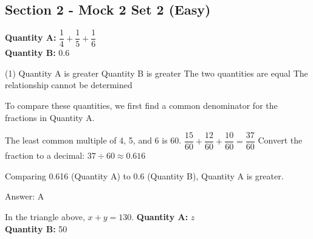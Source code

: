 \documentclass[11pt,paper=a4,answers]{exam}
\begin{document}
\begin{questions}
\pointsinrightmargin
\pointsdroppedatright
\marksnotpoints
{}
\pointformat{\boldmath\themarginpoints}
\bracketedpoints


\section*{Section 2 - Mock 2 Set 2 (Easy)}


\question
\textbf{Quantity A: } $\dfrac{1}{4} + \dfrac{1}{5} + \dfrac{1}{6}$ \\
\vspace{5pt}
\textbf{Quantity B: } 0.6

\begin{tasks}(1)
\task[A)] Quantity A is greater
\task[B)] Quantity B is greater
\task[C)] The two quantities are equal
\task[D)] The relationship cannot be determined
\end{tasks}

\begin{solution}
To compare these quantities, we first find a common denominator for the fractions in Quantity A.
\vspace{5pt}
\begin{center}
The least common multiple of 4, 5, and 6 is 60.
\vspace{5pt}
$\dfrac{15}{60} + \dfrac{12}{60} + \dfrac{10}{60} = \dfrac{37}{60}$
\vspace{5pt}
Convert the fraction to a decimal: $37 \div 60 \approx 0.616$
\end{center}
\vspace{5pt}
Comparing 0.616 (Quantity A) to 0.6 (Quantity B), Quantity A is greater.

Answer: \colorbox{yellow!100}{A}
\end{solution}

\vspace{1cm}

\question
\begin{center}
\end{center}
In the triangle above, $x + y = 130$.
\vspace{5pt}
\textbf{Quantity A: } $z$ \\
\vspace{5pt}
\textbf{Quantity B: } 50


\end{questions}
\end{document}

